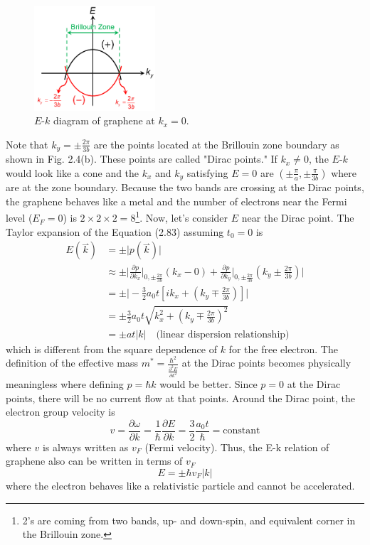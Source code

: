 \begin{figure}[tbp]
\includegraphics[width=0.4\textwidth]{figures/Fig2_5}
\centering
\caption{\small $E$-$k$ diagram of graphene at $k_{x} = 0$.}
\end{figure} Note that $k_{y} = \pm \frac{2\pi}{3b}$ are the points located at the Brillouin zone boundary as shown in Fig. 2.4(b). These points are called "Dirac points." If $k_{x} \neq 0$, the $E$-$k$ would look like a cone and the $k_{x}$ and $k_{y}$ satisfying $E = 0$ are $\left(\pm\frac{\pi}{a},\pm\frac{\pi}{3b}\right)$ where are at the zone boundary. Because the two bands are crossing at the Dirac points, the graphene behaves like a metal and the number of electrons near the Fermi level ($E_{F} = 0$) is $2\times 2\times 2 = 8$\footnote{2's are coming from two bands, up- and down-spin, and equivalent corner in the Brillouin zone.}. Now, let's consider $E$ near the Dirac point. The Taylor expansion of the Equation (2.83) assuming $t_{0} = 0$ is \begin{align}
    E(\overset{\rightharpoonup}{k})& = \pm \big|p(\overset{\rightharpoonup}{k})\big|\nonumber\\
    & \approx \pm\big|\frac{\partial p}{\partial k_{x}}\big|_{0,\pm \frac{2\pi}{3b}}\left(k_{x}-0\right) + \frac{\partial p}{\partial k_{y}}\big|_{0,\pm \frac{2\pi}{3b}}\left(k_{y}\pm\frac{2\pi}{3b}\right)\big|\nonumber\\
    & = \pm\big|-\frac{3}{2}a_{0}t\left[ik_{x}+\left(k_{y}\mp\frac{2\pi}{3b}\right)\right]\big|\nonumber\\
    & = \pm \frac{3}{2}a_{0}t\sqrt{k_{x}^{2}+\left(k_{y}\mp\frac{2\pi}{3b}\right)^{2}}\\
    & = \pm at\big|k\big| \quad \text{(linear dispersion relationship)}\nonumber
\end{align} which is different from the square dependence of $k$ for the free electron. The definition of the effective mass $m^{*} = \frac{\hbar^{2}}{\frac{\partial^{2} E}{\partial k^{2}}}$ at the Dirac points becomes physically meaningless where defining $p = \hbar k$ would be better. Since $p = 0$ at the Dirac points, there will be no current flow at that points. Around the Dirac point, the electron group velocity is \begin{equation}
    v = \frac{\partial \omega}{\partial k} = \frac{1}{\hbar}\frac{\partial E}{\partial k}=\frac{3}{2}\frac{a_{0}t}{\hbar}=\text{constant}
\end{equation} where $v$ is always written as $v_{F}$ (Fermi velocity). Thus, the E-k relation of graphene also can be written in terms of $v_{F}$ \begin{equation}
    E=\pm\hbar v_{F}\big|k\big|
\end{equation} where the electron behaves like a relativistic particle and cannot be accelerated.
